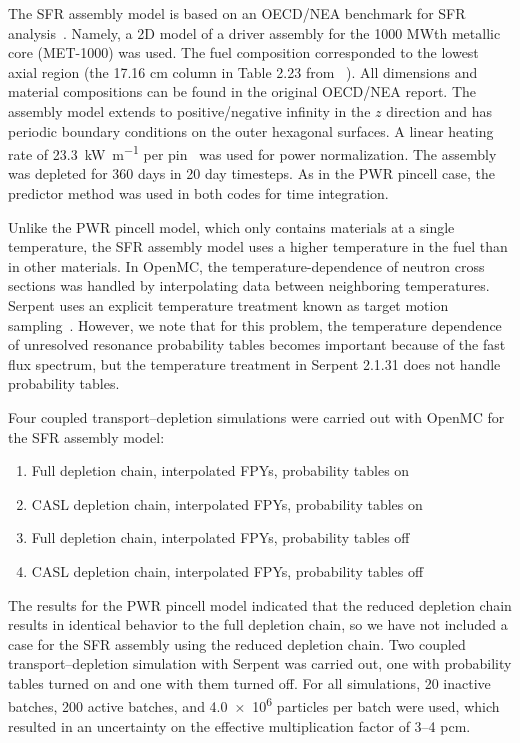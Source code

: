 \documentclass[3p,authoryear]{elsarticle}
\begin{document}
The SFR assembly model is based on an OECD/NEA benchmark for SFR
analysis~\citep{nsc2015}. Namely, a 2D model of a driver assembly for the 1000
MWth metallic core (MET-1000) was used. The fuel composition corresponded to the
lowest axial region (the 17.16 cm column in Table 2.23 from ~\citep{nsc2015}).
All dimensions and material compositions can be found in the original OECD/NEA
report. The assembly model extends to positive/negative infinity in the $z$
direction and has periodic boundary conditions on the outer hexagonal surfaces.
A linear heating rate of \SI{23.3}{\kilo\watt\per\meter} per
pin~\citep{cahalan2007anl} was used for power normalization. The assembly was
depleted for 360 days in 20 day timesteps. As in the PWR pincell case, the
predictor method was used in both codes for time integration.

Unlike the PWR pincell model, which only contains materials at a single
temperature, the SFR assembly model uses a higher temperature in the fuel than
in other materials. In OpenMC, the temperature-dependence of neutron cross
sections was handled by interpolating data between neighboring temperatures.
Serpent uses an explicit temperature treatment known as target motion
sampling~\citep{viitanen2012nse}. However, we note that for this problem, the
temperature dependence of unresolved resonance probability tables becomes
important because of the fast flux spectrum, but the temperature treatment in
Serpent 2.1.31 does not handle probability tables.

Four coupled transport--depletion simulations were carried out with OpenMC for
the SFR assembly model:
\begin{enumerate}
  \item Full depletion chain, interpolated FPYs, probability tables on
  \item CASL depletion chain, interpolated FPYs, probability tables on
  \item Full depletion chain, interpolated FPYs, probability tables off
  \item CASL depletion chain, interpolated FPYs, probability tables off
\end{enumerate}
The results for the PWR pincell model indicated that the reduced depletion chain
results in identical behavior to the full depletion chain, so we have not
included a case for the SFR assembly using the reduced depletion chain. Two
coupled transport--depletion simulation with Serpent was carried out, one with
probability tables turned on and one with them turned off. For all simulations,
20 inactive batches, 200 active batches, and \num{4.0e6} particles per batch
were used, which resulted in an uncertainty on the effective multiplication
factor of 3--4 pcm.
\end{document}
